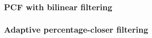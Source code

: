 \subsubsection{PCF with bilinear filtering}

\subsubsection{Adaptive percentage-closer filtering}


